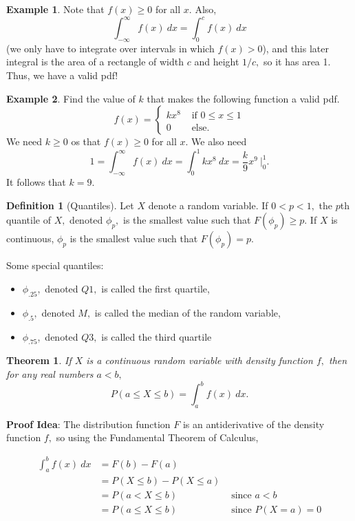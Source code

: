 \documentclass[
]{book}
\providecommand{\tightlist}{%
  \setlength{\itemsep}{0pt}\setlength{\parskip}{0pt}}
\newtheorem{theorem}{Theorem}[chapter]
\theoremstyle{definition}
\newtheorem{definition}{Definition}[chapter]
\theoremstyle{definition}
\newtheorem{example}{Example}[chapter]
\theoremstyle{definition}
\theoremstyle{definition}
\theoremstyle{remark}
\begin{document}
\begin{example}
Note that \(f(x) \geq 0\) for all \(x\). Also, \[\int_{-\infty}^{\infty} f(x)~dx = \int_0^c f(x)~dx\] (we only have to integrate over intervals in which \(f(x) > 0\)), and this later integral is the area of a rectangle of width \(c\) and height \(1/c,\) so it has area 1. Thus, we have a valid pdf!
\end{example}

\begin{example}
Find the value of \(k\) that makes the following function a valid pdf.
\[
f(x)=
\begin{cases}
kx^8 &\text{ if }0 \leq x \leq 1 \\
0 &\text{ else.}
\end{cases}
\]
We need \(k \geq 0\) os that \(f(x) \geq 0\) for all \(x\). We also need
\[1 = \int_{-\infty}^\infty f(x)~dx = \int_0^1 kx^8~dx = \frac{k}{9}x^9 ~\biggr|_0^1.\]
It follows that \(k = 9\).
\end{example}

\begin{definition}[Quantiles]
\protect\hypertarget{def:quantile}{}\label{def:quantile}Let \(X\) denote a random variable. If \(0 < p < 1,\) the \(p\)th quantile of \(X,\) denoted \(\phi_p,\) is the smallest value such that \(F(\phi_p) \geq p\). If \(X\) is continuous, \(\phi_p\) is the smallest value such that \(F(\phi_p) = p\).
\end{definition}

Some special quantiles:

\begin{itemize}
\tightlist
\item
  \(\phi_.25,\) denoted \(Q1,\) is called the first quartile,
\item
  \(\phi_.5,\) denoted \(M,\) is called the median of the random variable,
\item
  \(\phi_.75,\) denoted \(Q3,\) is called the third quartile
\end{itemize}

\begin{theorem}
If \(X\) is a continuous random variable with density function \(f,\) then for any real numbers \(a < b,\)
\[P(a \leq X \leq b) = \int_a^b f(x)~dx.\]
\end{theorem}

\textbf{Proof Idea}: The distribution function \(F\) is an antiderivative of the density function \(f,\) so using the Fundamental Theorem of Calculus,

\begin{align*}
\int_a^b f(x)~dx  &= F(b) - F(a) \\
                  &= P(X\leq b) - P(X \leq a) \\
                  &= P(a < X \leq b) &\text{ since } a < b\\
                  &= P(a \leq X \leq b) &\text{ since } P(X = a) = 0
\end{align*}
\end{document}
